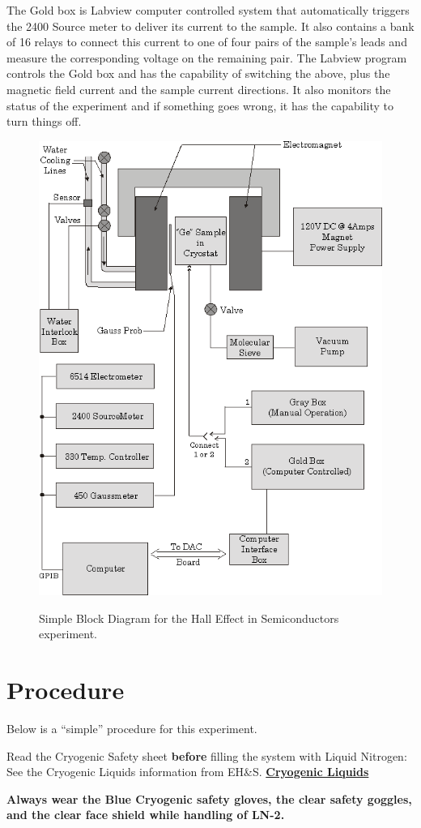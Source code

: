 \documentclass{../lab}
\begin{document}
The Gold box is Labview computer controlled system that automatically triggers the 2400 Source meter to deliver its current to the sample. It also contains a bank of 16 relays to connect this current to one of four pairs of the sample's leads and measure the corresponding voltage on the remaining pair. The Labview program controls the Gold box and has the capability of switching the above, plus the magnetic field current and the sample current directions. It also monitors the status of the experiment and if something goes wrong, it has the capability to turn things off.


\begin{figure}[h]
    \centering
    \href{http://experimentationlab.berkeley.edu/sites/default/files/images/SHEimage101.gif}{\includegraphics[width=0.5\linewidth]{images/SHEimage101.png}}
    \caption{Simple Block Diagram for the Hall Effect in Semiconductors experiment.}
    \label{fig:SimpleBlockDiagram}
\end{figure}

\section{Procedure}

Below is a ``simple'' procedure for this experiment.

Read the Cryogenic Safety sheet \textbf{before} filling the system with Liquid Nitrogen: See the Cryogenic Liquids information from EH\&S. \href{http://experimentationlab.berkeley.edu/sites/default/files/images/77cryogenic.pdf}{\textbf{Cryogenic Liquids}}

\textbf{Always wear the Blue Cryogenic safety gloves, the clear safety goggles, and the clear face shield while handling of LN-2.}
\end{document}
